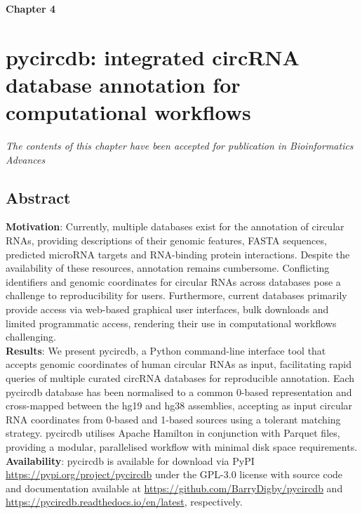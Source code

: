 {\Huge \bfseries \noindent Chapter 4}
\vspace{-1em} 
\section*{\LARGE pycircdb: integrated circRNA database annotation for computational workflows}
\setcounter{section}{4}
\setcounter{subsection}{0}  %
\renewcommand{\chapternum}{4}

\renewcommand{\thefigure}{\chapternum.\arabic{figure}}
\setcounter{figure}{0}
\renewcommand{\thetable}{\chapternum.\arabic{table}}
\setcounter{table}{0}

\begin{center}
    \textit{The contents of this chapter have been accepted for publication in Bioinformatics Advances}
\end{center}



\subsection*{Abstract}
\textbf{Motivation}: Currently, multiple databases exist for the annotation of circular RNAs, providing descriptions of their genomic features, FASTA sequences, predicted microRNA targets and RNA-binding protein interactions. Despite the availability of these resources, annotation remains cumbersome. Conflicting identifiers and genomic coordinates for circular RNAs across databases pose a challenge to reproducibility for users. Furthermore, current databases primarily provide access via web-based graphical user interfaces, bulk downloads and limited programmatic access, rendering their use in computational workflows challenging. \\
\textbf{Results}: We present pycircdb, a Python command-line interface tool that accepts genomic coordinates of human circular RNAs as input, facilitating rapid queries of multiple curated circRNA databases for reproducible annotation. Each pycircdb database has been normalised to a common 0-based representation and cross-mapped between the hg19 and hg38 assemblies, accepting as input circular RNA coordinates from 0-based and 1-based sources using a tolerant matching strategy. pycircdb utilises Apache Hamilton in conjunction with Parquet files, providing a modular, parallelised workflow with minimal disk space requirements.   \\
\textbf{Availability}: pycircdb is available for download via PyPI \href{https://pypi.org/project/pycircdb/}{https://pypi.org/project/pycircdb} under the GPL-3.0 license with source code and documentation available at \href{https://github.com/BarryDigby/pycircdb}{https://github.com/BarryDigby/pycircdb} and \href{https://pycircdb.readthedocs.io/en/latest/}{https://pycircdb.readthedocs.io/en/latest}, respectively.\\


